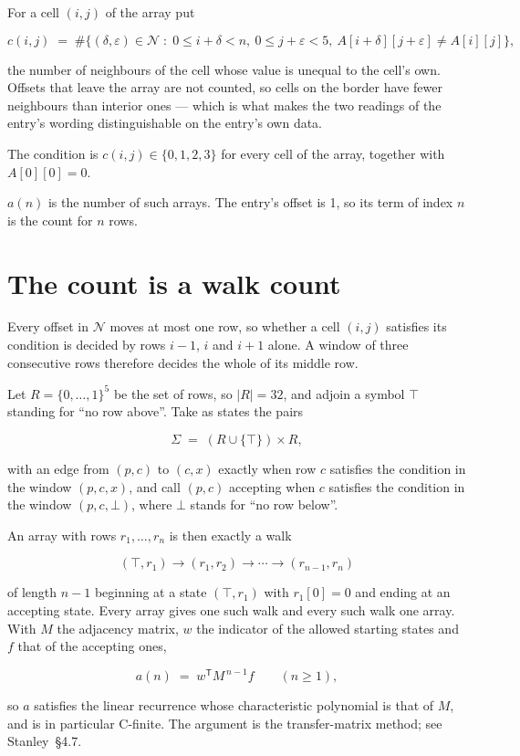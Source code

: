 \documentclass[11pt]{article}
\theoremstyle{definition}
\begin{document}
For a cell $(i,j)$ of the array put

\[c(i,j) \;=\; \#\bigl\{(\delta,\varepsilon)\in\mathcal{N} \;:\; 0\le i+\delta<n,\ 0\le j+\varepsilon<5,\ A[i+\delta][j+\varepsilon] \neq A[i][j]\bigr\},\]

the number of neighbours of the cell whose value is unequal to the cell's own. Offsets that leave the array are not counted, so cells on the border have fewer neighbours than interior ones --- which is what makes the two readings of the entry's wording distinguishable on the entry's own data.

The condition is $c(i,j) \in \{0, 1, 2, 3\}$ for every cell of the array, together with $A[0][0]=0$.

$a(n)$ is the number of such arrays. The entry's offset is 1, so its term of index $n$ is the count for $n$ rows.

\section{The count is a walk count}

Every offset in $\mathcal{N}$ moves at most one row, so whether a cell $(i,j)$ satisfies its condition is decided by rows $i-1$, $i$ and $i+1$ alone. A window of three consecutive rows therefore decides the whole of its middle row.

Let $R = \{0,\dots,1\}^{5}$ be the set of rows, so $|R| = 32$, and adjoin a symbol $\top$ standing for ``no row above''. Take as states the pairs

\[\Sigma \;=\; (R \cup \{\top\}) \times R,\]

with an edge from $(p,c)$ to $(c,x)$ exactly when row $c$ satisfies the condition in the window $(p,c,x)$, and call $(p,c)$ accepting when $c$ satisfies the condition in the window $(p,c,\bot)$, where $\bot$ stands for ``no row below''.

An array with rows $r_1,\dots,r_n$ is then exactly a walk

\[(\top,r_1) \to (r_1,r_2) \to \cdots \to (r_{n-1},r_n)\]

of length $n-1$ beginning at a state $(\top,r_1)$ with $r_1[0]=0$ and ending at an accepting state. Every array gives one such walk and every such walk one array. With $M$ the adjacency matrix, $w$ the indicator of the allowed starting states and $f$ that of the accepting ones,

\[a(n) \;=\; w^{\mathsf T} M^{\,n-1} f \qquad (n \ge 1),\]

so $a$ satisfies the linear recurrence whose characteristic polynomial is that of $M$, and is in particular C-finite. The argument is the transfer-matrix method; see Stanley~\S4.7.
\end{document}
